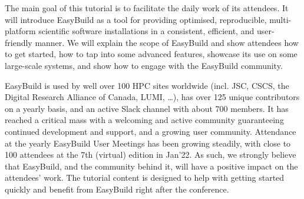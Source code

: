 The main goal of this tutorial is to facilitate the daily work of its attendees.
It will introduce EasyBuild as a tool for providing optimised, reproducible, multi-platform scientific software installations in a consistent, efficient, and user-friendly manner. We will explain the scope of EasyBuild and show attendees how to get started,
how to tap into some advanced features,
showcase its use on some large-scale systems,
and show how to engage with the EasyBuild community.

EasyBuild is used by well over 100 HPC sites worldwide (incl. JSC, CSCS, the Digital Research Alliance of Canada, LUMI, \ldots),
has over 125 unique contributors on a yearly basis,
and an active Slack channel with about 700 members.
It has reached a critical mass with a welcoming and active community guaranteeing continued development and support, and a
growing user community.
Attendance at the yearly EasyBuild User Meetings has been growing steadily, with close to 100 attendees at the 7th (virtual) edition in Jan'22.
As such, we strongly believe that EasyBuild, and the community behind it, will have a positive impact on the attendees' work.
The tutorial content is designed to help with getting started quickly and benefit from EasyBuild right after the conference.


